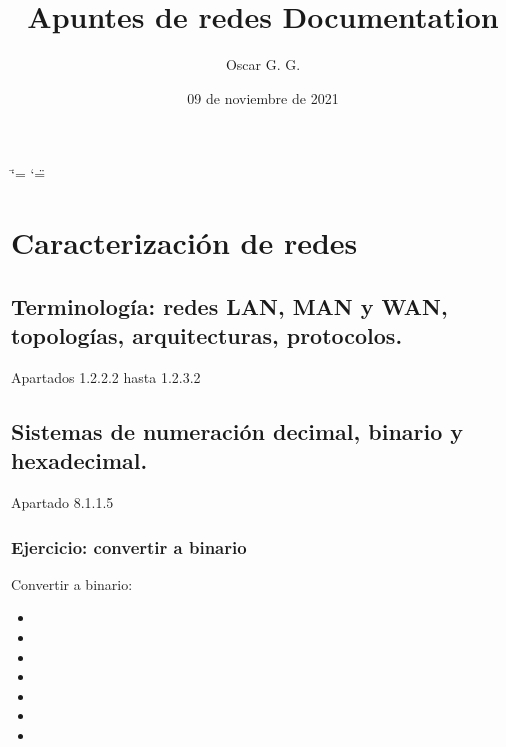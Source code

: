\documentclass[letterpaper,10pt,spanish]{sphinxmanual}
\title{Apuntes de redes Documentation}
\date{09 de noviembre de 2021}
\author{Oscar G. G.}
\begin{document}
\ifdefined\shorthandoff
  \ifnum\catcode`\=\string=\active\shorthandoff{=}\fi
  \ifnum\catcode`\"=\active{}\fi
\fi

\pagestyle{empty}
\sphinxmaketitle
\pagestyle{plain}
\sphinxtableofcontents
\pagestyle{normal}
\label{\detokenize{index::doc}}



\chapter{Caracterización de redes}
\label{\detokenize{t1_caracterizacion_redes/apuntes_t1:caracterizacion-de-redes}}\label{\detokenize{t1_caracterizacion_redes/apuntes_t1::doc}}

\section{Terminología: redes LAN, MAN y WAN, topologías, arquitecturas, protocolos.}
\label{\detokenize{t1_caracterizacion_redes/apuntes_t1:terminologia-redes-lan-man-y-wan-topologias-arquitecturas-protocolos}}
\sphinxAtStartPar
Apartados 1.2.2.2 hasta 1.2.3.2


\section{Sistemas de numeración decimal, binario y hexadecimal.}
\label{\detokenize{t1_caracterizacion_redes/apuntes_t1:sistemas-de-numeracion-decimal-binario-y-hexadecimal}}
\sphinxAtStartPar
Apartado 8.1.1.5


\subsection{Ejercicio: convertir a binario}
\label{\detokenize{t1_caracterizacion_redes/apuntes_t1:ejercicio-convertir-a-binario}}
\sphinxAtStartPar
Convertir a binario:
\begin{itemize}
\item {} 

\item {} 

\item {} 

\item {} 

\item {} 

\item {} 

\item {} 

\end{itemize}
\end{document}
